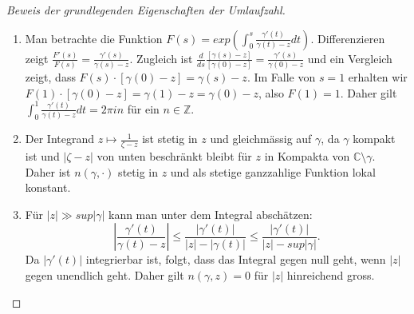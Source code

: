 \begin{proof}[Beweis der grundlegenden Eigenschaften der Umlaufzahl\label{jordan:proof:grundlegende_eigenschaften_umlaufzahl}]
    \begin{enumerate}
        \item Man betrachte die Funktion $F(s) = exp(\int_0^s \frac{\gamma'(t)}{\gamma(t) - z} dt)$. 
            Differenzieren zeigt $\frac{F'(s)}{F(s)} = \frac{\gamma'(s)}{\gamma(s) - z}$. 
            Zugleich ist $\frac{d}{ds} \frac{[\gamma(s) -z]}{[\gamma(0) -z]} = \frac{\gamma'(s)}{\gamma(0) - z}$ und ein Vergleich zeigt, dass $F(s) \cdot [\gamma(0) - z] = \gamma(s) -z$. 
            Im Falle von $s = 1$ erhalten wir $F(1) \cdot [\gamma(0) - z] = \gamma(1) -z = \gamma(0) - z$, also $F(1) = 1$.
            Daher gilt $\int_0^1 \frac{\gamma'(t)}{\gamma(t) - z} dt = 2 \pi i n$ für ein $n \in \mathbb{Z}$.
        \item Der Integrand $z \mapsto \frac{1}{\zeta - z}$ ist stetig in $z$ und gleichmässig auf $\gamma$, da $\gamma$ kompakt ist und $|\zeta - z|$ von unten beschränkt bleibt für $z$ in Kompakta von $\mathbb{C} \setminus \gamma$. 
            Daher ist $n(\gamma, \cdot)$ stetig in $z$ und als stetige ganzzahlige Funktion lokal konstant.
        \item Für $|z| \gg sup |\gamma|$ kann man unter dem Integral abschätzen: 
            \[
                \left| \frac{\gamma'(t)}{\gamma(t) - z} \right| \leq \frac{|\gamma'(t)|}{|z| - |\gamma(t)|} \leq \frac{|\gamma'(t)|}{|z| - sup |\gamma|}.
            \]
            Da $|\gamma'(t)|$ integrierbar ist, folgt, dass das Integral gegen null geht, wenn $|z|$ gegen unendlich geht. 
            Daher gilt $n(\gamma, z) = 0$ für $|z|$ hinreichend gross.
    \end{enumerate}
\end{proof}